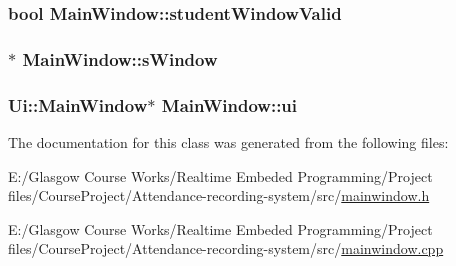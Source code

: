 \subsubsection[{student\+Window\+Valid}]{\setlength{\rightskip}{0pt plus 5cm}bool Main\+Window\+::student\+Window\+Valid\hspace{0.3cm}{\ttfamily [private]}}\label{class_main_window_a222458b690e6b51b1fd78f24475743e8}
\hypertarget{class_main_window_aad218c6ea271c5f52b8b9f8772b51e23}{}
\subsubsection[{s\+Window}]{$\ast$ Main\+Window\+::s\+Window\hspace{0.3cm}{\ttfamily [private]}}\label{class_main_window_aad218c6ea271c5f52b8b9f8772b51e23}
\hypertarget{class_main_window_a35466a70ed47252a0191168126a352a5}{}
\subsubsection[{ui}]{\setlength{\rightskip}{0pt plus 5cm}Ui\+::\+Main\+Window$\ast$ Main\+Window\+::ui\hspace{0.3cm}{\ttfamily [private]}}\label{class_main_window_a35466a70ed47252a0191168126a352a5}


The documentation for this class was generated from the following files\+:\begin{DoxyCompactItemize}
\item 
E\+:/\+Glasgow Course Works/\+Realtime Embeded Programming/\+Project files/\+Course\+Project/\+Attendance-\/recording-\/system/src/\hyperlink{mainwindow_8h}{mainwindow.\+h}\item 
E\+:/\+Glasgow Course Works/\+Realtime Embeded Programming/\+Project files/\+Course\+Project/\+Attendance-\/recording-\/system/src/\hyperlink{mainwindow_8cpp}{mainwindow.\+cpp}\end{DoxyCompactItemize}
